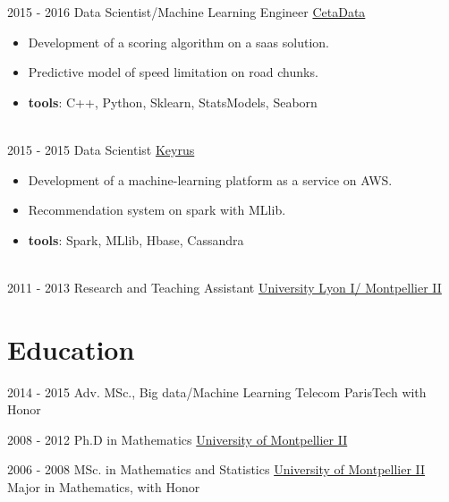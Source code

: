 \documentclass[letterpaper]{twentysecondcv} %
\begin{document}
\begin{twenty}
    \twentyitem
   		{2015 - 2016}
		{}
        {Data Scientist/Machine Learning Engineer}
        {\href{http://www.cetadata.com/}{CetaData}}
        {}
        {\vspace{-2mm}\begin{itemize}[topsep=0pt,partopsep=0pt]
				\item Development of a scoring algorithm on a saas solution.
        \item Predictive model of speed limitation on road chunks.
				\item \textbf{tools}: C++, Python, Sklearn, StatsModels, Seaborn
    \end{itemize}} \\
		
     \twentyitem
   		{2015 - 2015}
		{}
        {Data Scientist}
        {\href{http://www.keyrus.com/}{Keyrus}}
        {}
        {
        \vspace{-2mm}\begin{itemize}[topsep=0pt,partopsep=0pt]
        \item Development of a machine-learning platform as a service on AWS. 
				\item Recommendation system on spark with MLlib.
				\item \textbf{tools}: Spark, MLlib, Hbase, Cassandra
    \end{itemize} } \\
		
	\twentyitem
   		{2011 - 2013}
		{}
        {Research and Teaching Assistant}
        {\href{http://www.univ-lyon1.fr/}{University Lyon I/ Montpellier II}}
        {}
        {} 
        
\end{twenty}

\vspace{-0.25cm}
\section{Education}{\faGraduationCap}

\begin{twenty} %
	\twentyitemshorttest
    	{2014 - 2015}
        {}
        {Adv. MSc., Big data/Machine Learning}
        {Telecom ParisTech}
        {with Honor}
				
	\twentyitemshorttest
    	{2008 - 2012}
		{}
        {Ph.D in Mathematics}
        {\href{http://www.umontpellier.fr/}{University of Montpellier II}}
        {}
				
	\twentyitemshorttest
    	{2006 - 2008}
		{}
        {MSc. in Mathematics and Statistics}
        {\href{http://www.umontpellier.fr/}{University of Montpellier II}}
        {Major in Mathematics, with Honor}
\end{twenty}
\end{document}
